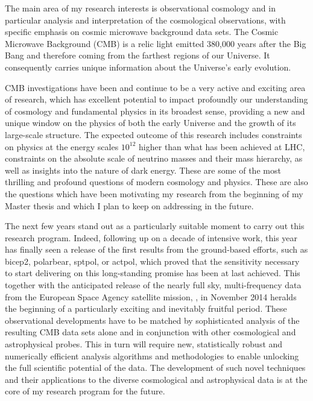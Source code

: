 \documentclass[11pt]{article}
\begin{document}
\thispagestyle{empty}
\thispagestyle{fancy}

The main area of my research interests is observational cosmology and in particular analysis and interpretation of the cosmological observations, with specific emphasis on cosmic microwave background data sets. 
The Cosmic Microwave Background (CMB) is a relic light emitted 380,000 years after the Big Bang  and therefore coming from the farthest regions of our Universe. It consequently carries unique information about the Universe's early evolution.

CMB investigations have been and continue to be a very active and exciting area of research, which has excellent potential to impact profoundly our understanding of cosmology and fundamental physics in its broadest sense, providing a new and unique window on the physics of both the early Universe and the growth of its large-scale structure. 
The expected outcome of this research includes constraints on physics at the energy scales $10^{12}$ higher than what has been achieved at LHC, constraints on the absolute scale of neutrino masses and their mass hierarchy, as well as insights into the nature of dark energy. 
These are some of the most thrilling and profound questions of modern cosmology and physics. 
These are also the questions which have been motivating my research
from the beginning of my Master thesis and which I plan to keep on addressing in the future.

The next few years stand out as a particularly suitable moment to carry out this research program. 
Indeed, following up on a decade of intensive work, this year has finally seen a release of the first results from the ground-based efforts, such as {\sc bicep2}, {\sc polarbear}, {\sc sptpol}, or {\sc actpol}, which proved that the sensitivity necessary to start delivering on this long-standing promise has been at last achieved. 
This together with the anticipated release of the nearly full sky, multi-frequency data from the European Space Agency satellite mission, {}, in November 2014 heralds the beginning of a particularly exciting and inevitably fruitful period. 
These observational developments have to be matched by sophisticated analysis of the resulting CMB data sets alone and in conjunction with other cosmological and astrophysical probes. This in turn will require new, statistically robust and numerically efficient analysis algorithms and methodologies to enable unlocking the full scientific potential of the data. The development of such novel techniques and their applications to the diverse cosmological and astrophysical data is at the core of my research program for the future.
\end{document}

